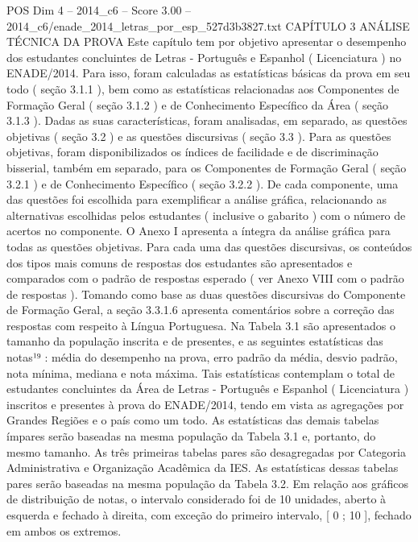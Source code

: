 \begin{textsample}{POS Dim 4 – 2014\_c6 – Score 3.00 – 2014\_c6/enade\_2014\_letras\_por\_esp\_527d3b3827.txt}  \label{ex:f4_pos_078}
CAPÍTULO 3 ANÁLISE TÉCNICA DA PROVA Este capítulo tem por objetivo apresentar o desempenho dos estudantes concluintes de Letras - Português e Espanhol ( Licenciatura ) no ENADE/2014.
Para isso, foram calculadas as estatísticas básicas da prova em seu todo ( seção 3.1.1 ), bem como as estatísticas relacionadas aos Componentes de Formação Geral ( seção 3.1.2 ) e de Conhecimento Específico da Área ( seção 3.1.3 ).
Dadas as suas características, foram analisadas, em separado, as questões objetivas ( seção 3.2 ) e as questões discursivas ( seção 3.3 ).
Para as questões objetivas, foram disponibilizados os índices de facilidade e de discriminação bisserial, também em separado, para os Componentes de Formação Geral ( seção 3.2.1 ) e de Conhecimento Específico ( seção 3.2.2 ).
De cada componente, uma das questões foi escolhida para exemplificar a análise gráfica, relacionando as alternativas escolhidas pelos estudantes ( inclusive o gabarito ) com o número de acertos no componente.
O Anexo I apresenta a íntegra da análise gráfica para todas as questões objetivas.
Para cada uma das questões discursivas, os conteúdos dos tipos mais comuns de respostas dos estudantes são apresentados e comparados com o padrão de respostas esperado ( ver Anexo VIII com o padrão de respostas ).
Tomando como base as duas questões discursivas do Componente de Formação Geral, a seção 3.3.1.6 apresenta comentários sobre a correção das respostas com respeito à Língua Portuguesa.
Na Tabela 3.1 são apresentados o tamanho da população inscrita e de presentes, e as seguintes estatísticas das notas¹⁹ : média do desempenho na prova, erro padrão da média, desvio padrão, nota mínima, mediana e nota máxima.
Tais estatísticas contemplam o total de estudantes concluintes da Área de Letras - Português e Espanhol ( Licenciatura ) inscritos e presentes à prova do ENADE/2014, tendo em vista as agregações por Grandes Regiões e o país como um todo.
As estatísticas das demais tabelas ímpares serão baseadas na mesma população da Tabela 3.1 e, portanto, do mesmo tamanho.
As três primeiras tabelas pares são desagregadas por Categoria Administrativa e Organização Acadêmica da IES.
As estatísticas dessas tabelas pares serão baseadas na mesma população da Tabela 3.2.
Em relação aos gráficos de distribuição de notas, o intervalo considerado foi de 10 unidades, aberto à esquerda e fechado à direita, com exceção do primeiro intervalo, [ 0 ; 10 ], fechado em ambos os extremos.

\end{textsample}
